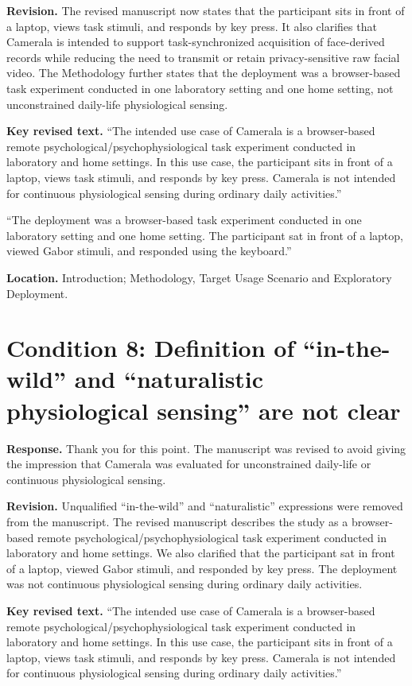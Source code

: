 \documentclass[11pt]{article}
\newcommand{\condition}[2]{\section*{Condition #1: #2}}
\begin{document}
\textbf{Revision.}
The revised manuscript now states that the participant sits in front of a laptop, views task stimuli, and responds by key press.
It also clarifies that Camerala is intended to support task-synchronized acquisition of face-derived records while reducing the need to transmit or retain privacy-sensitive raw facial video.
The Methodology further states that the deployment was a browser-based task experiment conducted in one laboratory setting and one home setting, not unconstrained daily-life physiological sensing.

\textbf{Key revised text.}
``The intended use case of Camerala is a browser-based remote psychological/psychophysiological task experiment conducted in laboratory and home settings. In this use case, the participant sits in front of a laptop, views task stimuli, and responds by key press. Camerala is not intended for continuous physiological sensing during ordinary daily activities.''

``The deployment was a browser-based task experiment conducted in one laboratory setting and one home setting. The participant sat in front of a laptop, viewed Gabor stimuli, and responded using the keyboard.''

\textbf{Location.}
Introduction; Methodology, Target Usage Scenario and Exploratory Deployment.

\condition{8}{Definition of ``in-the-wild'' and ``naturalistic physiological sensing'' are not clear}
\textbf{Response.}
Thank you for this point.
The manuscript was revised to avoid giving the impression that Camerala was evaluated for unconstrained daily-life or continuous physiological sensing.

\textbf{Revision.}
Unqualified ``in-the-wild'' and ``naturalistic'' expressions were removed from the manuscript.
The revised manuscript describes the study as a browser-based remote psychological/psychophysiological task experiment conducted in laboratory and home settings.
We also clarified that the participant sat in front of a laptop, viewed Gabor stimuli, and responded by key press.
The deployment was not continuous physiological sensing during ordinary daily activities.

\textbf{Key revised text.}
``The intended use case of Camerala is a browser-based remote psychological/psychophysiological task experiment conducted in laboratory and home settings. In this use case, the participant sits in front of a laptop, views task stimuli, and responds by key press. Camerala is not intended for continuous physiological sensing during ordinary daily activities.''
\end{document}
